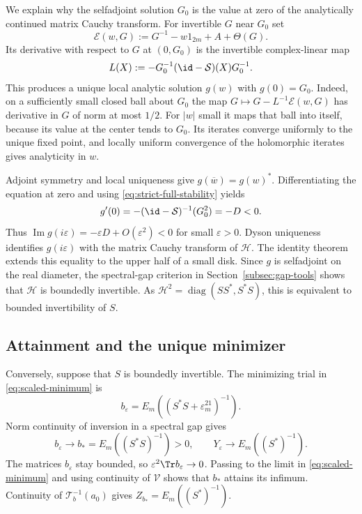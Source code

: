 We explain why the selfadjoint solution $G_0$ is the value at zero of the analytically continued matrix Cauchy transform.
For invertible $G$ near $G_0$ set
\[
 \mathcal E(w,G):=G^{-1}-w1_{2m}+A+\Theta(G).
\]
Its derivative with respect to $G$ at $(0,G_0)$ is the invertible complex-linear map
\[
 L(X):=-G_0^{-1}(\id-\mathcal S)(X)G_0^{-1}.
\]
This produces a unique local analytic solution $g(w)$ with $g(0)=G_0$.
Indeed, on a sufficiently small closed ball about $G_0$ the map $G\mapsto G-L^{-1}\mathcal E(w,G)$ has derivative in $G$ of norm at most $1/2$.
For $|w|$ small it maps that ball into itself, because its value at the center tends to $G_0$.
Its iterates converge uniformly to the unique fixed point, and locally uniform convergence of the holomorphic iterates gives analyticity in $w$.

Adjoint symmetry and local uniqueness give $g(\overline w)=g(w)^*$.
Differentiating the equation at zero and using \eqref{eq:strict-full-stability} yields
\begin{equation}\label{eq:gap-derivative}
 g'(0)=-(\id-\mathcal S)^{-1}(G_0^2)=-D<0.
\end{equation}
Thus $\operatorname{Im}g(i\varepsilon)=-\varepsilon D+O(\varepsilon^2)<0$ for small $\varepsilon>0$.
Dyson uniqueness identifies $g(i\varepsilon)$ with the matrix Cauchy transform of $\mathscr H$.
The identity theorem extends this equality to the upper half of a small disk.
Since $g$ is selfadjoint on the real diameter, the spectral-gap criterion in Section~\ref{subsec:gap-tools} shows that $\mathscr H$ is boundedly invertible.
As $\mathscr H^2=\operatorname{diag}(SS^*,S^*S)$, this is equivalent to bounded invertibility of $S$.

\subsection{Attainment and the unique minimizer}
Conversely, suppose that $S$ is boundedly invertible.
The minimizing trial in \eqref{eq:scaled-minimum} is
\[
 b_\varepsilon=E_m((S^*S+\varepsilon^21_m)^{-1}).
\]
Norm continuity of inversion in a spectral gap gives
\[
 b_\varepsilon\longrightarrow b_*=E_m((S^*S)^{-1})>0,
 \qquad Y_\varepsilon\longrightarrow E_m((S^*)^{-1}).
\]
The matrices $b_\varepsilon$ stay bounded, so $\varepsilon^2\Tr b_\varepsilon\to0$.
Passing to the limit in \eqref{eq:scaled-minimum} and using continuity of $\mathcal V$ shows that $b_*$ attains its infimum.
Continuity of $\mathcal T_b^{-1}(a_0)$ gives $Z_{b_*}=E_m((S^*)^{-1})$.

